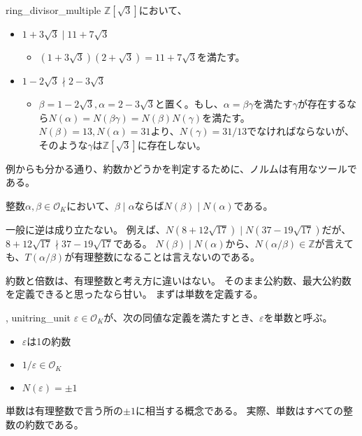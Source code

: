 \begin{Exam}{}{ring_divisor_multiple}
$\mathbb{Z}[\sqrt{3}]$において、
\begin{itemize}
 \item $1+3\sqrt{3} \mid 11+7\sqrt{3}$
 \begin{itemize}
  \item $(1+3\sqrt{3})(2+\sqrt{3})=11+7\sqrt{3}$を満たす。
 \end{itemize}
 \item $1-2\sqrt{3} \nmid 2-3\sqrt{3}$
 \begin{itemize}
  \item $\beta=1-2\sqrt{3}, \alpha=2-3\sqrt{3}$と置く。もし、$\alpha=\beta\gamma$を満たす$\gamma$が存在するなら$N(\alpha)=N(\beta\gamma)=N(\beta)N(\gamma)$を満たす。$N(\beta)=13, N(\alpha)=31$より、$N(\gamma)=31/13$でなければならないが、そのような$\gamma$は$\mathbb{Z}[\sqrt{3}]$に存在しない。
 \end{itemize}
\end{itemize}
\end{Exam}

例からも分かる通り、約数かどうかを判定するために、ノルムは有用なツールである。

\begin{Prop}{}{}
整数$\alpha,\beta\in\mathcal{O}_K$において、$\beta \mid \alpha$ならば$N(\beta) \mid N(\alpha)$である。
\end{Prop}

一般に逆は成り立たない。
例えば、$N(8+12\sqrt{17}) \mid N(37-19\sqrt{17})$だが、$8+12\sqrt{17} \nmid 37-19\sqrt{17}$である。
$N(\beta) \mid N(\alpha)$から、$N(\alpha/\beta)\in\mathbb{Z}$が言えても、$T(\alpha/\beta)$が有理整数になることは言えないのである。

約数と倍数は、有理整数と考え方に違いはない。
そのまま公約数、最大公約数を定義できると思ったなら甘い。
まずは単数を定義する。

\begin{Defi}{, unit}{ring_unit}
$\varepsilon\in\mathcal{O}_K$が、次の同値な定義を満たすとき、$\varepsilon$を単数と呼ぶ。
\begin{itemize}
 \item $\varepsilon$は1の約数
 \item $1/\varepsilon \in\mathcal{O}_K$
 \item $N(\varepsilon) = \pm1$
\end{itemize}
\end{Defi}

単数は有理整数で言う所の$\pm1$に相当する概念である。
実際、単数はすべての整数の約数である。


